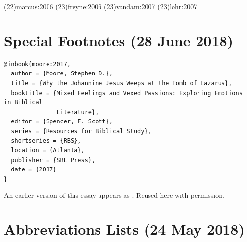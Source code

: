 \documentclass[a4paper]{article}
\begin{document}
\examplecite(22){marcus:2006}
\examplecite(23){freyne:2006}
\examplecite(23){vandam:2007}
\examplecite(23){lohr:2007}
\exampleabbreviations
\examplebibliography
{}

\section{Special Footnotes (28 June 2018)}

\begin{verbatim}
@inbook{moore:2017,
  author = {Moore, Stephen D.},
  title = {Why the Johannine Jesus Weeps at the Tomb of Lazarus},
  booktitle = {Mixed Feelings and Vexed Passions: Exploring Emotions in Biblical
               Literature},
  editor = {Spencer, F. Scott},
  series = {Resources for Biblical Study},
  shortseries = {RBS},
  location = {Atlanta},
  publisher = {SBL Press},
  date = {2017}
}
\end{verbatim}

\begin{verbcite}
  An earlier version of this essay appears as \cite*{moore:2017}. Reused here
  with permission.
\end{verbcite}
\exampleabbreviations
\examplebibliography
{}

\section{Abbreviations Lists (24 May 2018)}
\end{document}
